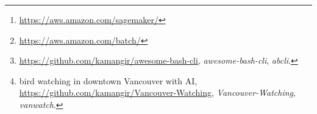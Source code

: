 \begin{abstract}
In this paper, we discuss the Mathematics of building Machine Vision AI systems in Linux. We review the general challenge of translating the description of an AI operation in human language into a human-readable, machine-executable script. We select multiple Machine Vision AI challenges that we first describe in human language. Then, in each case, we build the language to convert the description in human language into one or more scripts we execute on machines. We use AWS SageMaker~\footnote{\url{https://aws.amazon.com/sagemaker/}} for development and training and AWS Batch~\footnote{\url{https://aws.amazon.com/batch/}} for inference and discuss API calls. The main contribution of this paper is a mathematical framework for building an AI language for a practical use-case in Machine Vision. We hope that researchers in other fields of AI use and extend this framework in their disciplines. We present a reference implementation~\footnote{\url{https://github.com/kamangir/awesome-bash-cli}, \emph{awesome-bash-cli}, \emph{abcli}.} of this framework and multiple use-cases~\footnote{bird watching in downtown Vancouver with AI, \url{https://github.com/kamangir/Vancouver-Watching}, \emph{Vancouver-Watching}, \emph{vanwatch}.} - \emph{revision-\revision}
\end{abstract}